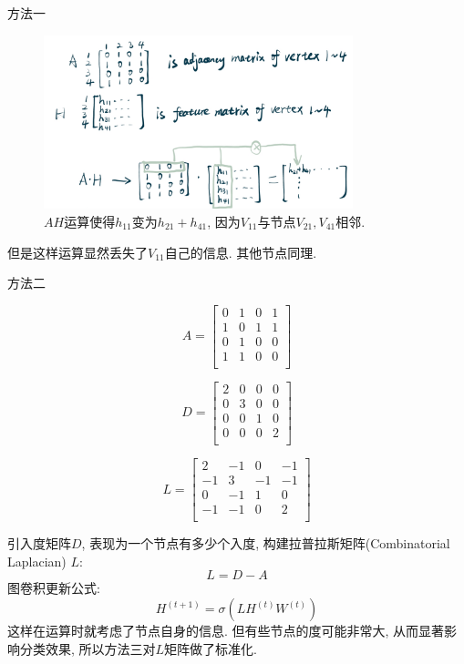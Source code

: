 \documentclass{beamer}
\begin{document}
\begin{frame}{方法一}
    \begin{figure}
        \centering
        \includegraphics[width=0.8\textwidth]{聚合1.png}
        \caption{$AH$运算使得$h_{11}$变为$h_{21}+h_{41}$, 因为$V_{11}$与节点$V_{21}, V_{41}$相邻.}
    \end{figure}
    但是这样运算显然丢失了$V_{11}$自己的信息. 其他节点同理.
\end{frame}

\begin{frame}{方法二}\footnotesize
    \begin{multicols}{3}
        \[
            A =
            \begin{bmatrix}
                0 & 1 & 0 & 1 \\
                1 & 0 & 1 & 1 \\
                0 & 1 & 0 & 0 \\
                1 & 1 & 0 & 0 \\
            \end{bmatrix}
        \]

        \[
            D =
            \begin{bmatrix}
                2 & 0 & 0 & 0 \\
                0 & 3 & 0 & 0 \\
                0 & 0 & 1 & 0 \\
                0 & 0 & 0 & 2 \\
            \end{bmatrix}
        \]

        \[
            L =
            \begin{bmatrix}
                2  & -1 & 0  & -1 \\
                -1 & 3  & -1 & -1 \\
                0  & -1 & 1  & 0  \\
                -1 & -1 & 0  & 2  \\
            \end{bmatrix}
        \]
    \end{multicols}
    引入度矩阵$D$, 表现为一个节点有多少个入度, 构建拉普拉斯矩阵(Combinatorial Laplacian) $L$:
    $$L = D - A$$
    图卷积更新公式:
    $$ H^{(t+1)} = \sigma(LH^{(t)}W^{(t)}) $$
    这样在运算时就考虑了节点自身的信息. 但有些节点的度可能非常大, 从而显著影响分类效果, 所以方法三对$L$矩阵做了标准化.
\end{frame}
\end{document}
